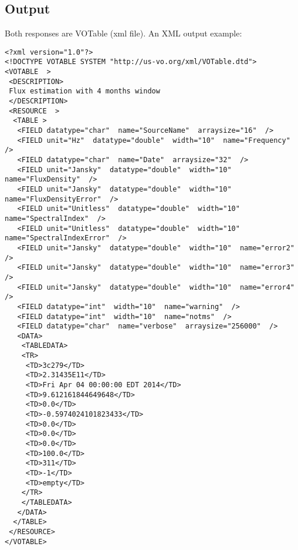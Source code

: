 \documentclass[10pt]{article}
\begin{document}
\subsection{Output}
\noindent Both responses are VOTable (xml file). An XML output example:
\lstset{language=XML}
\begin{lstlisting}
<?xml version="1.0"?>
<!DOCTYPE VOTABLE SYSTEM "http://us-vo.org/xml/VOTable.dtd">
<VOTABLE  >
 <DESCRIPTION>
 Flux estimation with 4 months window
 </DESCRIPTION>
 <RESOURCE  >
  <TABLE >
   <FIELD datatype="char"  name="SourceName"  arraysize="16"  />
   <FIELD unit="Hz"  datatype="double"  width="10"  name="Frequency"  />
   <FIELD datatype="char"  name="Date"  arraysize="32"  />
   <FIELD unit="Jansky"  datatype="double"  width="10"  name="FluxDensity"  />
   <FIELD unit="Jansky"  datatype="double"  width="10"  name="FluxDensityError"  />
   <FIELD unit="Unitless"  datatype="double"  width="10"  name="SpectralIndex"  />
   <FIELD unit="Unitless"  datatype="double"  width="10"  name="SpectralIndexError"  />
   <FIELD unit="Jansky"  datatype="double"  width="10"  name="error2"  />
   <FIELD unit="Jansky"  datatype="double"  width="10"  name="error3"  />
   <FIELD unit="Jansky"  datatype="double"  width="10"  name="error4"  />
   <FIELD datatype="int"  width="10"  name="warning"  />
   <FIELD datatype="int"  width="10"  name="notms"  />
   <FIELD datatype="char"  name="verbose"  arraysize="256000"  />
   <DATA>
    <TABLEDATA>
    <TR>
     <TD>3c279</TD>
     <TD>2.31435E11</TD>
     <TD>Fri Apr 04 00:00:00 EDT 2014</TD>
     <TD>9.612161844649648</TD>
     <TD>0.0</TD>
     <TD>-0.5974024101823433</TD>
     <TD>0.0</TD>
     <TD>0.0</TD>
     <TD>0.0</TD>
     <TD>100.0</TD>
     <TD>311</TD>
     <TD>-1</TD>
     <TD>empty</TD>
    </TR>
    </TABLEDATA>
   </DATA>
  </TABLE>
 </RESOURCE>
</VOTABLE>
\end{lstlisting}
\end{document}
